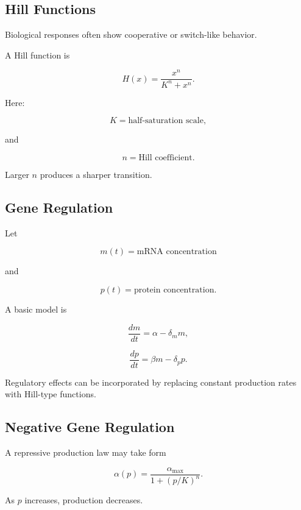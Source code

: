 \subsection{Hill Functions}
\label{subsec:hill-functions}

Biological responses often show cooperative or switch-like behavior.

A Hill function is

\[
\boxed{
H(x)
=
\frac{x^n}
{K^n+x^n}.
}
\]

Here:

\[
K
=
\text{half-saturation scale},
\]

and

\[
n
=
\text{Hill coefficient}.
\]

Larger \(n\) produces a sharper transition.

\subsection{Gene Regulation}
\label{subsec:gene-regulation-models}

Let

\[
m(t)
=
\text{mRNA concentration}
\]

and

\[
p(t)
=
\text{protein concentration}.
\]

A basic model is

\[
\boxed{
\frac{dm}{dt}
=
\alpha
-
\delta_m m,
}
\]

\[
\boxed{
\frac{dp}{dt}
=
\beta m
-
\delta_p p.
}
\]

Regulatory effects can be incorporated by replacing constant production
rates with Hill-type functions.

\subsection{Negative Gene Regulation}
\label{subsec:negative-gene-regulation}

A repressive production law may take form

\[
\boxed{
\alpha(p)
=
\frac{\alpha_{\max}}
{1+(p/K)^n}.
}
\]

As \(p\) increases, production decreases.

